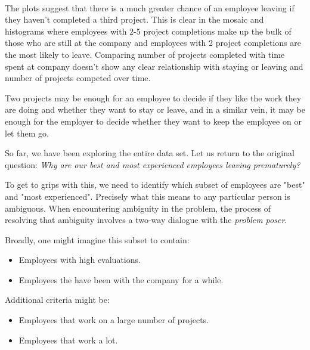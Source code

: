 \documentclass[11pt]{article}
\providecommand{\tightlist}{%
      \setlength{\itemsep}{0pt}\setlength{\parskip}{0pt}}
\begin{document}
    \begin{center}
    \end{center}
    { \hspace*{\fill} \\}
    
    The plots suggest that there is a much greater chance of an employee
leaving if they haven't completed a third project. This is clear in the
mosaic and histograms where employees with 2-5 project completions make
up the bulk of those who are still at the company and employees with 2
project completions are the most likely to leave. Comparing number of
projects completed with time spent at company doesn't show any clear
relationship with staying or leaving and number of projects competed
over time.

Two projects may be enough for an employee to decide if they like the
work they are doing and whether they want to stay or leave, and in a
similar vein, it may be enough for the employer to decide whether they
want to keep the employee on or let them go.

    So far, we have been exploring the entire data set. Let us return to the
original question: \emph{Why are our best and most experienced employees
leaving prematurely?}

To get to grips with this, we need to identify which subset of employees
are "best" and "most experienced". Precisely what this means to any
particular person is ambiguous. When encountering ambiguity in the
problem, the process of resolving that ambiguity involves a two-way
dialogue with the \emph{problem poser}.

Broadly, one might imagine this subset to contain:

\begin{itemize}
\tightlist
\item
  Employees with high evaluations.
\item
  Employees the have been with the company for a while.
\end{itemize}

Additional criteria might be:

\begin{itemize}
\tightlist
\item
  Employees that work on a large number of projects.
\item
  Employees that work a lot.
\end{itemize}
\end{document}
